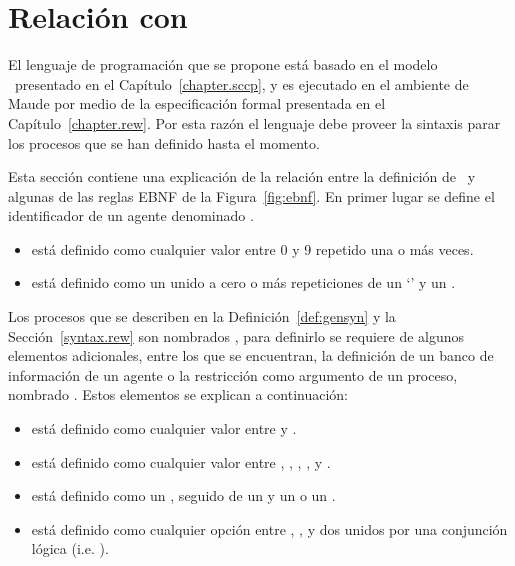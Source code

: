 \section{Relaci\'on con \SCCP}
\label{sccp.lang}

El lenguaje de programaci\'on que se propone est\'a basado en el modelo \SCCP \ presentado en el Cap\'itulo~\ref{chapter.sccp}, y es ejecutado en el ambiente de Maude por medio de la especificaci\'on formal presentada en el Cap\'itulo~\ref{chapter.rew}. Por esta raz\'on el lenguaje debe proveer la sintaxis parar los procesos que se han definido hasta el momento. 

Esta secci\'on contiene una explicaci\'on de la relaci\'on entre la definici\'on de \SCCP \ y algunas de las reglas EBNF de la Figura~\ref{fig:ebnf}. En primer lugar se define el identificador de un agente denominado .

\begin{itemize}
\item {} est\'a definido como cualquier valor entre 0 y 9 repetido una o m\'as veces.
\item {} est\'a definido como un  unido a cero o m\'as repeticiones de un `' y un .
\end{itemize}

Los procesos que se describen en la Definici\'on~\ref{def:gensyn} y la Secci\'on~\ref{syntax.rew} son nombrados , para definirlo se requiere de algunos elementos adicionales, entre los que se encuentran, la definici\'on de un banco de informaci\'on de un agente o la restricci\'on como argumento de un proceso, nombrado . Estos elementos se explican a continuaci\'on:

\begin{itemize}
\item {} est\'a definido como cualquier valor entre  y .
\item {} est\'a definido como cualquier valor entre \textterm{>}, \textterm{<}, \textterm{=}, \textterm{=/=}, \textterm{>=} y \textterm{<=}.
\item {} est\'a definido como un , seguido de un  y un  o un . 
\item {} est\'a definido como cualquier opci\'on entre , ,  y dos  unidos por una conjunci\'on l\'ogica (i.e. ).
\end{itemize}

